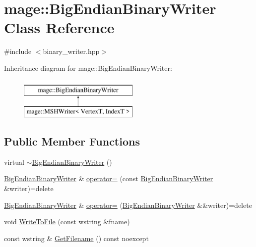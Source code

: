 \hypertarget{classmage_1_1_big_endian_binary_writer}{}\section{mage\+:\+:Big\+Endian\+Binary\+Writer Class Reference}
\label{classmage_1_1_big_endian_binary_writer}


{\ttfamily \#include $<$binary\+\_\+writer.\+hpp$>$}

Inheritance diagram for mage\+:\+:Big\+Endian\+Binary\+Writer\+:\begin{figure}[H]
\begin{center}
\leavevmode
\includegraphics[height=2.000000cm]{classmage_1_1_big_endian_binary_writer}
\end{center}
\end{figure}
\subsection*{Public Member Functions}
\begin{DoxyCompactItemize}
\item 
virtual \hyperlink{classmage_1_1_big_endian_binary_writer_ab717bcbfc15ba4a1cb25eeb564e120b8}{$\sim$\+Big\+Endian\+Binary\+Writer} ()
\item 
\hyperlink{classmage_1_1_big_endian_binary_writer}{Big\+Endian\+Binary\+Writer} \& \hyperlink{classmage_1_1_big_endian_binary_writer_ae574f7d0b630890256996c52818ba633}{operator=} (const \hyperlink{classmage_1_1_big_endian_binary_writer}{Big\+Endian\+Binary\+Writer} \&writer)=delete
\item 
\hyperlink{classmage_1_1_big_endian_binary_writer}{Big\+Endian\+Binary\+Writer} \& \hyperlink{classmage_1_1_big_endian_binary_writer_a92b57976cca0ff1859a487a1fe238211}{operator=} (\hyperlink{classmage_1_1_big_endian_binary_writer}{Big\+Endian\+Binary\+Writer} \&\&writer)=delete
\item 
void \hyperlink{classmage_1_1_big_endian_binary_writer_a02fb2c39f5a52dc25c8d08516e1af621}{Write\+To\+File} (const wstring \&fname)
\item 
const wstring \& \hyperlink{classmage_1_1_big_endian_binary_writer_a61a80be19c7b59ff5803e51401e8f646}{Get\+Filename} () const noexcept
\end{DoxyCompactItemize}
